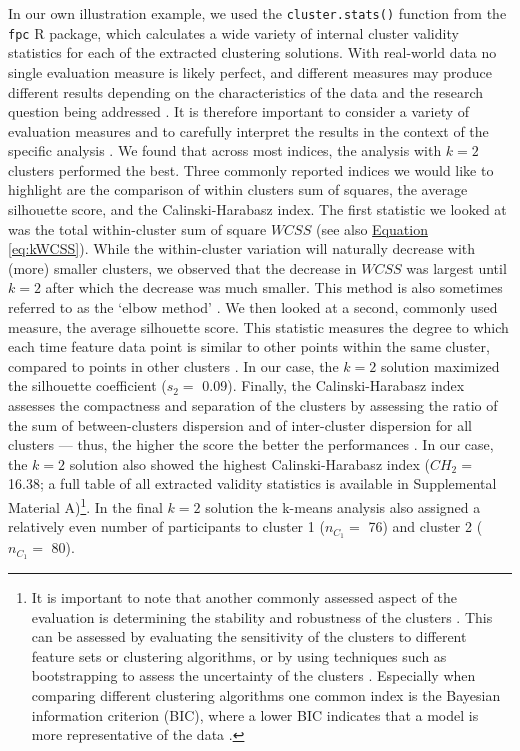 \documentclass[man, 12pt, a4paper, floatsintext]{apa7}
\theoremstyle{break}
\theoremstyle{plain}
\newcommand{\equatref}[2][]{\hyperref[#2]{Equation \ref*{#2}#1}}
\begin{document}
In our own illustration example, we used the \texttt{cluster.stats()}
function from the \texttt{fpc} \textsf{R} package, which calculates a
wide variety of internal cluster validity statistics for each of the
extracted clustering solutions. With real-world data no single
evaluation measure is likely perfect, and different measures may produce
different results depending on the characteristics of the data and the
research question being addressed \citep{kittler1998}. It is therefore
important to consider a variety of evaluation measures and to carefully
interpret the results in the context of the specific analysis
\citep{vinh2009}. We found that across most indices, the analysis with
\(k=2\) clusters performed the best. Three commonly reported indices we
would like to highlight are the comparison of within clusters sum of
squares, the average silhouette score, and the Calinski-Harabasz index.
The first statistic we looked at was the total within-cluster sum of
square \(WCSS\) (see also \equatref{eq:kWCSS}). While the within-cluster
variation will naturally decrease with (more) smaller clusters, we
observed that the decrease in \(WCSS\) was largest until \(k=2\) after
which the decrease was much smaller. This method is also sometimes
referred to as the `elbow method' \citep{syakur2018}. We then looked at
a second, commonly used measure, the average silhouette score. This
statistic measures the degree to which each time feature data point is
similar to other points within the same cluster, compared to points in
other clusters \citep{rousseeuw1987}. In our case, the \(k=2\) solution
maximized the silhouette coefficient (\(s_2=\) 0.09). Finally, the
Calinski-Harabasz index assesses the compactness and separation of the
clusters by assessing the ratio of the sum of between-clusters
dispersion and of inter-cluster dispersion for all clusters --- thus,
the higher the score the better the performances \citep{calinski1974}.
In our case, the \(k=2\) solution also showed the highest
Calinski-Harabasz index (\(CH_2=\) 16.38; a full table of all extracted
validity statistics is available in Supplemental Material
A)\footnote{It is important to note that another commonly assessed aspect of the evaluation is determining the stability and robustness of the clusters \citep{berkhin2006}. This can be assessed by evaluating the sensitivity of the clusters to different feature sets or clustering algorithms, or by using techniques such as bootstrapping to assess the uncertainty of the clusters \citep{vinh2009}. Especially when comparing different clustering algorithms one common index is the Bayesian information criterion (BIC), where a lower BIC indicates that a model is more representative of the data \citep{vandeschoot2017}.}.
In the final \(k=2\) solution the k-means analysis also assigned a
relatively even number of participants to cluster 1 (\(n_{C_1}=\) 76)
and cluster 2 (\(n_{C_1}=\) 80).
\end{document}
